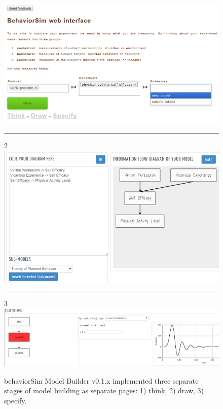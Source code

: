 \documentclass{sigchi}
\begin{document}
\begin{figure}[!t]
  \includegraphics[width=0.9\columnwidth]{img/v1-think}
  \rule{\columnwidth}{0.4pt}
  2
  \includegraphics[width=0.9\columnwidth]{img/v1-draw}
  \rule{\columnwidth}{0.4pt}
  3
  \includegraphics[width=0.9\columnwidth]{img/v1-specify}  
  \caption{behaviorSim Model Builder v0.1.x implemented three separate stages of model building as separate pages: 1) think, 2) draw, 3) specify.}
  \label{model-builder-v1}
\end{figure}
\end{document}
